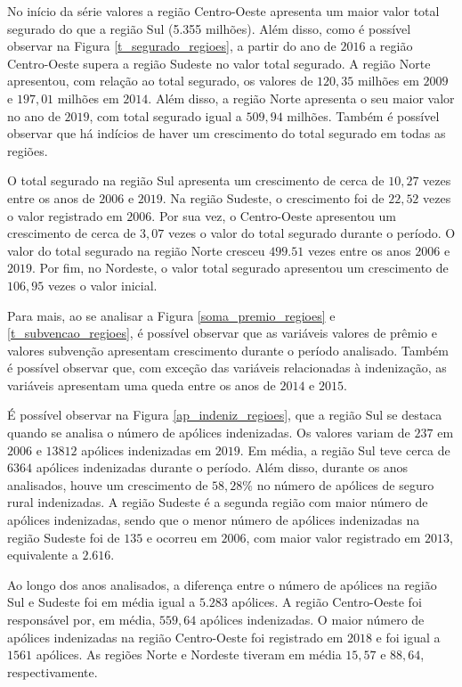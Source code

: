 No início da série valores a região Centro-Oeste apresenta um maior valor total segurado do que a região Sul (5.355 milhões). Além disso, como é possível observar na Figura \ref{t_segurado_regioes}, a partir do ano de $2016$ a região Centro-Oeste supera a região Sudeste no valor total segurado. A região Norte apresentou, com relação ao total segurado, os valores de $120,35$ milhões em $2009$ e $197,01$ milhões em $2014$. 
Além disso, a região Norte apresenta o seu maior valor no ano de $2019$, com total segurado igual a $509,94$ milhões. Também é possível observar que há indícios de haver um crescimento do total segurado em todas as regiões. 

O total segurado na região Sul apresenta um crescimento de cerca de $10,27$ vezes entre os anos de $2006$ e $2019$. Na região Sudeste, o crescimento foi de $22,52$ vezes o valor registrado em $2006$. Por sua vez, o Centro-Oeste apresentou um crescimento de cerca de $3,07$ vezes o valor do total segurado durante o período. O valor do total segurado na região Norte cresceu $499.51$ vezes entre os anos $2006$ e $2019$. Por fim, no Nordeste, o valor total segurado apresentou um crescimento de $106,95$ vezes o valor inicial. 

Para mais, ao se analisar a Figura \ref{soma_premio_regioes} e \ref{t_subvencao_regioes}, é possível observar que as variáveis valores de prêmio e valores subvenção apresentam crescimento durante o período analisado. Também é possível observar que, com exceção das variáveis relacionadas à indenização, as variáveis apresentam uma queda entre os anos de $2014$ e $2015$.

É possível observar na Figura \ref{ap_indeniz_regioes}, que a região Sul se destaca quando se analisa o número de apólices indenizadas. Os valores variam de $237$ em $2006$ e $13812$ apólices indenizadas em $2019$. Em média, a região Sul teve cerca de $6364$ apólices indenizadas durante o período. Além disso, durante os anos analisados, houve um crescimento de $58,28\%$ no número de apólices de seguro rural indenizadas. A região Sudeste é a segunda região com maior número de apólices indenizadas, sendo que o menor número de apólices indenizadas na região Sudeste foi de $135$ e ocorreu em $2006$, com maior valor registrado em $2013$, equivalente a $2.616$. 

Ao longo dos anos analisados, a diferença entre o número de apólices na região Sul e Sudeste foi em média igual a $5.283$ apólices. A região Centro-Oeste foi responsável por, em média, $559,64$ apólices indenizadas. O maior número de apólices indenizadas na região Centro-Oeste foi registrado em $2018$ e foi igual a $1561$ apólices. As regiões Norte e Nordeste tiveram em média $15,57$ e $88,64$, respectivamente. 

